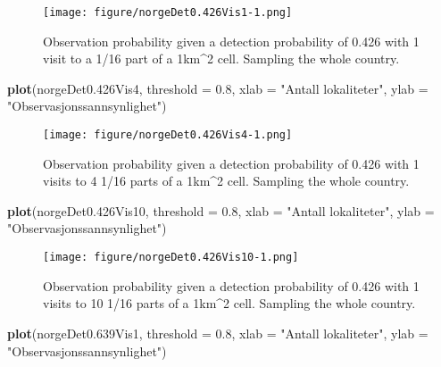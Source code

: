 \documentclass[]{article}
\newenvironment{Shaded}{\begin{snugshade}}{\end{snugshade}}
\newcommand{\KeywordTok}[1]{\textcolor[rgb]{0.13,0.29,0.53}{\textbf{#1}}}
\newcommand{\DataTypeTok}[1]{\textcolor[rgb]{0.13,0.29,0.53}{#1}}
\newcommand{\FloatTok}[1]{\textcolor[rgb]{0.00,0.00,0.81}{#1}}
\newcommand{\StringTok}[1]{\textcolor[rgb]{0.31,0.60,0.02}{#1}}
\newcommand{\NormalTok}[1]{#1}
\begin{document}
\begin{figure}
\centering
\texttt{[image: figure/norgeDet0.426Vis1-1.png]}
\caption{Observation probability given a detection probability of 0.426
with 1 visit to a 1/16 part of a 1km\^{}2 cell. Sampling the whole
country.}
\end{figure}

\begin{Shaded}
\begin{Highlighting}[]
\KeywordTok{plot}\NormalTok{(norgeDet0.426Vis4, }\DataTypeTok{threshold =} \FloatTok{0.8}\NormalTok{, }\DataTypeTok{xlab =} \StringTok{"Antall lokaliteter"}\NormalTok{, }\DataTypeTok{ylab =} \StringTok{"Observasjonssannsynlighet"}\NormalTok{)}
\end{Highlighting}
\end{Shaded}

\begin{figure}
\centering
\texttt{[image: figure/norgeDet0.426Vis4-1.png]}
\caption{Observation probability given a detection probability of 0.426
with 1 visits to 4 1/16 parts of a 1km\^{}2 cell. Sampling the whole
country.}
\end{figure}

\begin{Shaded}
\begin{Highlighting}[]
\KeywordTok{plot}\NormalTok{(norgeDet0.426Vis10, }\DataTypeTok{threshold =} \FloatTok{0.8}\NormalTok{, }\DataTypeTok{xlab =} \StringTok{"Antall lokaliteter"}\NormalTok{, }\DataTypeTok{ylab =} \StringTok{"Observasjonssannsynlighet"}\NormalTok{)}
\end{Highlighting}
\end{Shaded}

\begin{figure}
\centering
\texttt{[image: figure/norgeDet0.426Vis10-1.png]}
\caption{Observation probability given a detection probability of 0.426
with 1 visits to 10 1/16 parts of a 1km\^{}2 cell. Sampling the whole
country.}
\end{figure}

\begin{Shaded}
\begin{Highlighting}[]
\KeywordTok{plot}\NormalTok{(norgeDet0.639Vis1, }\DataTypeTok{threshold =} \FloatTok{0.8}\NormalTok{, }\DataTypeTok{xlab =} \StringTok{"Antall lokaliteter"}\NormalTok{, }\DataTypeTok{ylab =} \StringTok{"Observasjonssannsynlighet"}\NormalTok{)}
\end{Highlighting}
\end{Shaded}
\end{document}
